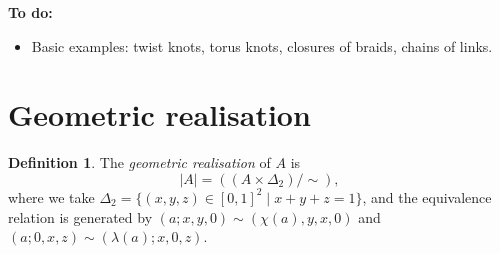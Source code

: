 \documentclass{amsart}
\newcommand{\st}        {\;|\;}
\newcommand{\tm}        {\times}
\newcommand{\Dl}        {\Delta}
\newcommand{\lm}        {\lambda}
\renewcommand{\:}{\colon}
\theoremstyle{definition}
\newtheorem{definition}[theorem]{Definition}
\begin{document}
\textbf{To do:}
\begin{itemize}
 \item Basic examples: twist knots, torus knots, closures of braids,
  chains of links.
\end{itemize}

\section{Geometric realisation}

\begin{definition}
 The \emph{geometric realisation} of $A$ is 
 \[ |A| = ((A\tm\Dl_2)/\sim), \]
 where we take $\Dl_2=\{(x,y,z)\in [0,1]^2\st x+y+z=1\}$, and the
 equivalence relation is generated by $(a;x,y,0)\sim(\chi(a),y,x,0)$
 and $(a;0,x,z)\sim(\lm(a);x,0,z)$.
\end{definition}
\end{document}
